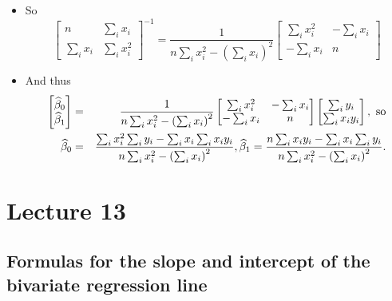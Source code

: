 \documentclass[11pt]{article}
\begin{document}
\begin{itemize}
\item So 
\begin{equation*}
\begin{bmatrix}
n & \sum\nolimits_{i}x_{i} \\ 
\sum\nolimits_{i}x_{i} & \sum\nolimits_{i}x_{i}^{2}%
\end{bmatrix}%
^{-1}=\frac{1}{n\sum\nolimits_{i}x_{i}^{2}-\left(
\sum\nolimits_{i}x_{i}\right) ^{2}}%
\begin{bmatrix}
\sum\nolimits_{i}x_{i}^{2} & -\sum\nolimits_{i}x_{i} \\ 
-\sum\nolimits_{i}x_{i} & n%
\end{bmatrix}%
\end{equation*}

\item And thus%
\begin{eqnarray*}
\begin{bmatrix}
\widehat{\beta }_{0} \\ 
\widehat{\beta }_{1}%
\end{bmatrix}
&=&\frac{1}{n\sum\nolimits_{i}x_{i}^{2}-\left( \sum\nolimits_{i}x_{i}\right)
^{2}}%
\begin{bmatrix}
\sum\nolimits_{i}x_{i}^{2} & -\sum\nolimits_{i}x_{i} \\ 
-\sum\nolimits_{i}x_{i} & n%
\end{bmatrix}%
\begin{bmatrix}
\sum\nolimits_{i}y_{i} \\ 
\sum\nolimits_{i}x_{i}y_{i}%
\end{bmatrix}%
,\text{ so} \\
\widehat{\beta }_{0} &=&\frac{\sum\nolimits_{i}x_{i}^{2}\sum%
\nolimits_{i}y_{i}-\sum\nolimits_{i}x_{i}\sum\nolimits_{i}x_{i}y_{i}}{%
n\sum\nolimits_{i}x_{i}^{2}-\left( \sum\nolimits_{i}x_{i}\right) ^{2}},%
\widehat{\beta }_{1}=\frac{n\sum\nolimits_{i}x_{i}y_{i}-\sum%
\nolimits_{i}x_{i}\sum\nolimits_{i}y_{i}}{n\sum\nolimits_{i}x_{i}^{2}-\left(
\sum\nolimits_{i}x_{i}\right) ^{2}}.
\end{eqnarray*}
\end{itemize}

\section{Lecture 13}

\subsection{Formulas for the slope and intercept of the bivariate regression
line}
\end{document}
